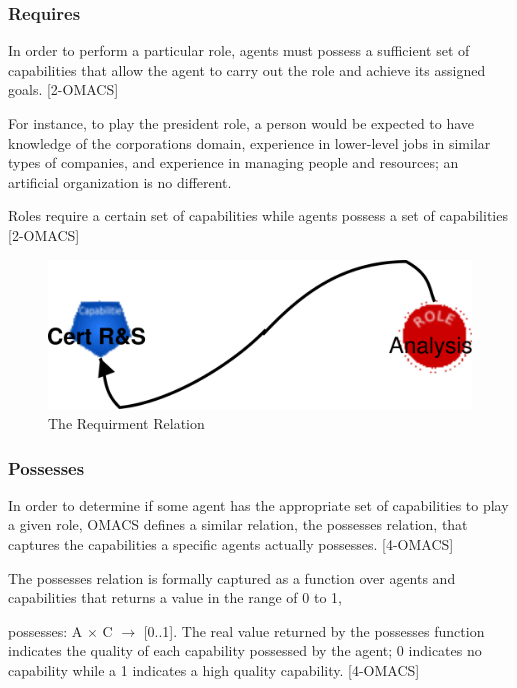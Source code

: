 \subsubsection{Requires}

In order to perform a particular role, agents must possess a sufficient set of capabilities that allow
the agent to carry out the role and achieve its assigned goals. [2-OMACS]

For instance, to play the  president role,
 a person would be expected to have knowledge of the corporations domain, experience in
lower-level jobs in similar types of companies, and experience in managing people and resources;
an artificial organization is no different. 

Roles require a certain set of capabilities while agents
possess a set of capabilities [2-OMACS]


\begin{figure}[th]
	\centering
		\includegraphics{chapiter1/img/r}
	\caption{\label{fig:The Requirment Relation}The Requirment Relation }
\end{figure}



\subsubsection{Possesses}
In order to determine if some agent has the appropriate set of capabilities to play a given role, OMACS defines a similar relation, the possesses relation, that captures the capabilities a specific agents actually possesses. [4-OMACS]

The possesses relation is formally captured as a function over agents and capabilities that returns a value in the range of 0 to 1,

 possesses: A $\times$ C $\rightarrow$ [0..1]. The real value returned by the possesses function indicates the quality of each capability possessed by the agent; 0 indicates no capability while a 1 indicates a high quality capability. [4-OMACS]


